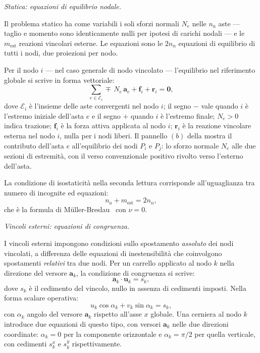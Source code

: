 \medskip
\noindent\textit{Statica: equazioni di equilibrio nodale.}
\label{subsec:equilibrio_nodale}

Il problema statico ha come variabili i soli sforzi
normali $N_e$ nelle $n_a$ aste --- taglio e momento
sono identicamente nulli per ipotesi di carichi nodali
--- e le $m_\text{est}$ reazioni vincolari esterne.
Le equazioni sono le $2n_n$ equazioni di equilibrio
di tutti i nodi, due proiezioni per nodo.

Per il nodo $i$ --- nel caso generale di nodo vincolato ---
l'equilibrio nel riferimento globale si scrive in forma
vettoriale:
\begin{equation}\label{eq:equilibrio_nodale}
	\sum_{e \in \mathcal{E}_i}
	\mp\, N_e\, \mathbf{a}_e
	+ \mathbf{f}_i + \mathbf{r}_i = \bm{0},
\end{equation}
dove $\mathcal{E}_i$ è l'insieme delle aste convergenti
nel nodo $i$; il segno $-$ vale quando $i$ è l'estremo
iniziale dell'asta $e$ e il segno $+$ quando $i$ è
l'estremo finale; $N_e > 0$ indica trazione;
$\mathbf{f}_i$ è la forza
attiva applicata al nodo $i$; $\mathbf{r}_i $ è la reazione vincolare
esterna nel nodo $i$, nulla per i nodi liberi. 
Il pannello $(b)$ della 
mostra il contributo dell'asta $e$ all'equilibrio dei
nodi $P_i$ e $P_j$: lo sforzo normale $N_e$ alle due
sezioni di estremità, con il verso convenzionale positivo
rivolto verso l'esterno dell'asta.

La condizione di isostaticità nella seconda lettura
corrisponde all'uguaglianza tra numero di incognite
ed equazioni:
\[
n_a + m_\text{est} = 2n_n,
\]
che è la formula di M\"{u}ller-Breslau~
con $\nu = 0$.

\medskip
\noindent\textit{Vincoli esterni: equazioni di congruenza.}
\label{subsec:vincoli_esterni}

I vincoli esterni impongono condizioni sullo spostamento
\emph{assoluto} dei nodi vincolati, a differenza delle
equazioni di inestensibilità che coinvolgono spostamenti
\emph{relativi} tra due nodi. Per un carrello applicato
al nodo $k$ nella direzione del versore $\mathbf{a}_k$,
la condizione di congruenza si scrive:
\begin{equation}\label{eq:vincolo_esterno}
	\mathbf{a}_k \cdot \mathbf{u}_k = s_k,
\end{equation}
dove $s_k$ è il cedimento del vincolo, nullo in assenza
di cedimenti imposti. Nella forma scalare operativa:
\begin{equation}\label{eq:vincolo_esterno_scalare}
	u_k \cos\alpha_k + v_k \sin\alpha_k = s_k,
\end{equation}
con $\alpha_k$ angolo del versore $\mathbf{a}_k$ rispetto
all'asse $x$ globale. Una cerniera al nodo $k$ introduce
due equazioni di questo tipo, con versori $\mathbf{a}_k$
nelle due direzioni coordinate: $\alpha_k = 0$ per la
componente orizzontale e $\alpha_k = \pi/2$ per quella
verticale, con cedimenti $s_k^x$ e $s_k^y$ rispettivamente.

